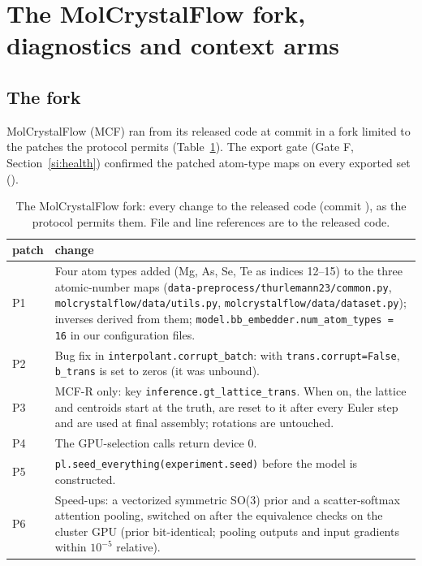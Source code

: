 \documentclass[journal=acsodf,manuscript=article]{achemso}
\begin{document}
\clearpage
\section{The MolCrystalFlow fork, diagnostics and context arms}\label{si:mcfdiag}
\subsection{The fork}
MolCrystalFlow\cite{zeng2026molcrystalflow} (MCF) ran from its released code at commit
\svMcfBase{} in a fork limited to the patches the protocol permits (Table~\ref{tab:si_fork}).
The export gate (Gate F, Section~\ref{si:health}) confirmed the patched atom-type maps on every
exported set (\svForkSets).

\begin{table}[htbp]
\caption{The MolCrystalFlow fork: every change to the released code (commit \svMcfBase), as the
protocol permits them. File and line references are to the released code.}
\label{tab:si_fork}
\centering
\small
\begin{tabular}{@{}lp{12.2cm}@{}}
\toprule
patch & change \\
\midrule
P1 & Four atom types added (Mg, As, Se, Te as indices 12--15) to the three atomic-number maps
(\texttt{data-preprocess/thurlemann23/common.py}, \texttt{molcrystalflow/data/utils.py},
\texttt{molcrystalflow/data/dataset.py}); inverses derived from them;
\texttt{model.bb\_embedder.num\_atom\_types = 16} in our configuration files. \\
P2 & Bug fix in \texttt{interpolant.corrupt\_batch}: with \texttt{trans.corrupt=False},
\texttt{b\_trans} is set to zeros (it was unbound). \\
P3 & MCF-R only: key \texttt{inference.gt\_lattice\_trans}. When on, the lattice and centroids
start at the truth, are reset to it after every Euler step and are used at final assembly;
rotations are untouched. \\
P4 & The GPU-selection calls return device 0. \\
P5 & \texttt{pl.seed\_everything(experiment.seed)} before the model is constructed. \\
P6 & Speed-ups: a vectorized symmetric SO(3) prior and a scatter-softmax attention pooling,
switched on after the equivalence checks on the cluster GPU (prior bit-identical; pooling outputs
and input gradients within $10^{-5}$ relative). \\
\bottomrule
\end{tabular}
\end{table}
\end{document}
